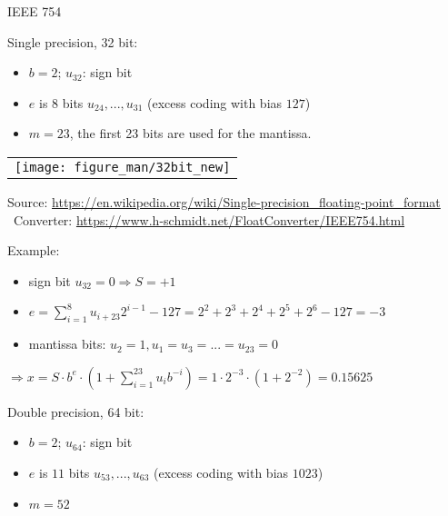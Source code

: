 \documentclass[11pt,compress,t,notes=noshow, xcolor=table]{beamer}
\begin{document}
\begin{vbframe}{IEEE 754}

Single precision, 32 bit:
\begin{itemize}
  \item $b = 2$; $u_{32}$: sign bit
  \item $e$ is $8$ bits $u_{24}, ..., u_{31}$ (excess coding with bias $127$)
  \item $m = 23$, the first 23 bits are used for the mantissa.
\end{itemize}

\begin{center}
\begin{tabular}{l}
  \texttt{[image: figure\_man/32bit\_new]} \\[0.15cm]
\end{tabular}
{\scriptsize
Source: \url{https://en.wikipedia.org/wiki/Single-precision_floating-point_format}\\\
Converter: \url{https://www.h-schmidt.net/FloatConverter/IEEE754.html}
}
\end{center}

Example:
\begin{itemize}
  \item sign bit $u_{32} = 0 \Rightarrow S = +1$
  \item $e = \sum_{i=1}^{8} u_{i+23} 2^{i-1} - 127 = 2^2 + 2^3+ 2^4+ 2^5 + 2^6 - 127 = -3$
  \item mantissa bits: $u_2 = 1, u_1=u_3=...=u_{23}=0$
\end{itemize}


$\Rightarrow x = S \cdot b^e \cdot (1 + \sum_{i=1}^{23} u_{i} b^{-i}) = 1 \cdot 2^{-3} \cdot (1 + 2^{-2}) = 0.15625$

\framebreak

Double precision, 64 bit:
\begin{itemize}
  \item $b = 2$; $u_{64}$: sign bit
  \item $e$ is $11$ bits $u_{53}, ..., u_{63}$ (excess coding with bias $1023$)
  \item $m = 52$
\end{itemize}




\end{vbframe}
\end{document}
